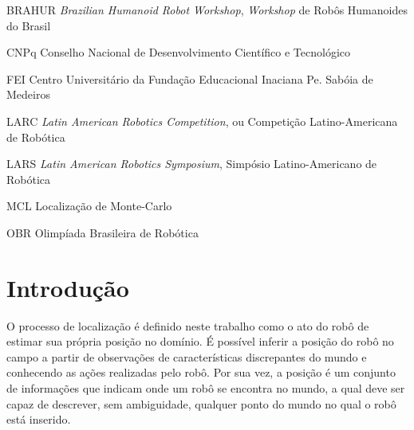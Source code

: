 \documentclass[
  12pt,       %
  oneside,
  a4paper,      %
  english,      %
  french,       %
  spanish,      %
  brazil,       %
  ]{abntex2}
\begin{document}
\listoffigures*
\cleardoublepage


\begin{siglas}  
  \item[BRAHUR] \textit{Brazilian Humanoid Robot Workshop}, \textit{Workshop} de Robôs Humanoides do Brasil
  \item[CNPq] Conselho Nacional de Desenvolvimento Científico e Tecnológico
  \item[FEI] Centro Universitário da Fundação Educacional Inaciana Pe. Sabóia de Medeiros
  \item[LARC] \textit{Latin American Robotics Competition}, ou Competição Latino-Americana de Robótica
  \item[LARS] \textit{Latin American Robotics Symposium}, Simpósio Latino-Americano de Robótica
  \item[MCL] Localização de Monte-Carlo
  \item[OBR] Olimpíada Brasileira de Robótica
\end{siglas}


\tableofcontents*
\cleardoublepage


\textual

\chapter{Introdução}

O processo de localização é definido neste trabalho como o ato do robô de estimar sua própria posição no domínio.
É possível inferir a posição do robô no campo a partir de observações de características discrepantes do mundo e conhecendo as ações realizadas pelo robô.
Por sua vez, a posição é um conjunto de informações que indicam onde um robô se encontra no mundo, a qual deve ser capaz de descrever, sem ambiguidade, qualquer ponto do mundo no qual o robô está inserido.
\end{document}
